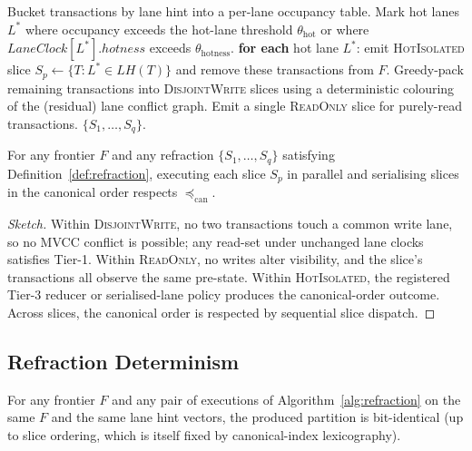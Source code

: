 \begin{algorithm}[H]
\caption{Compute refraction of frontier $F$}
\label{alg:refraction}
\begin{algorithmic}[1]
\State Bucket transactions by lane hint into a per-lane occupancy table.
\State Mark hot lanes $L^*$ where occupancy exceeds the hot-lane
       threshold $\theta_{\mathrm{hot}}$ or where
       $\mathit{LaneClock}[L^*].\mathit{hotness}$ exceeds
       $\theta_{\mathrm{hotness}}$.
\State \textbf{for each} hot lane $L^*$: emit \textsc{HotIsolated}
       slice $S_p \gets \{T : L^* \in \mathit{LH}(T)\}$ and remove
       these transactions from $F$.
\State Greedy-pack remaining transactions into \textsc{DisjointWrite}
       slices using a deterministic colouring of the (residual) lane
       conflict graph.
\State Emit a single \textsc{ReadOnly} slice for purely-read
       transactions.
\State \Return $\{S_1, \ldots, S_q\}$.
\end{algorithmic}
\end{algorithm}

\begin{lemma}
\label{lem:refraction-safe}
For any frontier $F$ and any refraction $\{S_1, \ldots, S_q\}$
satisfying Definition~\ref{def:refraction}, executing each slice
$S_p$ in parallel and serialising slices in the canonical order
respects $\preceq_{\mathrm{can}}$.
\end{lemma}

\begin{proof}[Sketch]
Within \textsc{DisjointWrite}, no two transactions touch a common
write lane, so no MVCC conflict is possible; any read-set under
unchanged lane clocks satisfies Tier-1.
Within \textsc{ReadOnly}, no writes alter visibility, and the
slice's transactions all observe the same pre-state.
Within \textsc{HotIsolated}, the registered Tier-3 reducer or
serialised-lane policy produces the canonical-order outcome.
Across slices, the canonical order is respected by sequential slice
dispatch.
\end{proof}

\subsection{Refraction Determinism}

\begin{invariant}
\label{inv:refraction-deterministic}
For any frontier $F$ and any pair of executions of
Algorithm~\ref{alg:refraction} on the same $F$ and the same lane
hint vectors, the produced partition is bit-identical (up to slice
ordering, which is itself fixed by canonical-index lexicography).
\end{invariant}

